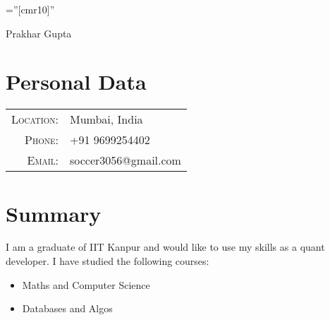 \documentclass[a4paper,10pt]{article}
\begin{document}

\pagestyle{empty} %

\font\fb=''[cmr10]'' %

\par{\centering
		{\Huge Prakhar {Gupta}
	}\bigskip\par}

\section{Personal Data}

\begin{tabular}{rl}
    \textsc{Location:}  & Mumbai, India\\
    \textsc{Phone:}     & {+91 9699254402}\\
    \textsc{Email:}     & {soccer3056@gmail.com} 
\end{tabular}

\section{Summary}
\begin{adjustwidth}{0.3cm}{}
 I am a graduate of IIT Kanpur and would like to use my skills as a quant developer. I have studied the following courses: 



\begin{itemize} 

	\item Maths and Computer Science 

	\item Databases and Algos 

\end{itemize} 
\end{adjustwidth}


\end{document}

